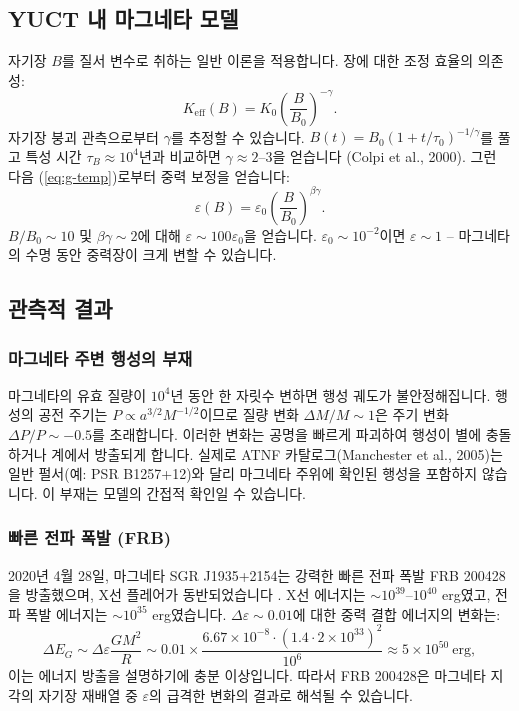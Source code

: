 \documentclass[11pt,a4paper]{article}
\newcommand{\Keff}{K_{\mathrm{eff}}}
\newcommand{\eps}{\varepsilon}
\begin{document}
	\subsection{YUCT 내 마그네타 모델}
	\label{subsec:magnetars-model}
	
	자기장 $B$를 질서 변수로 취하는 일반 이론을 적용합니다. 장에 대한 조정 효율의 의존성:
	\begin{equation}
		\Keff(B) = K_0 \left( \frac{B}{B_0} \right)^{-\gamma}.
		\label{eq:keff-b}
	\end{equation}
	자기장 붕괴 관측으로부터 $\gamma$를 추정할 수 있습니다. $B(t) = B_0 (1 + t/\tau_0)^{-1/\gamma}$를 풀고 특성 시간 $\tau_B \approx 10^4$년과 비교하면 $\gamma \approx 2$–$3$을 얻습니다 (Colpi et al., 2000). 그런 다음 (\ref{eq:g-temp})로부터 중력 보정을 얻습니다:
	\begin{equation}
		\eps(B) = \eps_0 \left( \frac{B}{B_0} \right)^{\beta\gamma}.
		\label{eq:eps-b}
	\end{equation}
	$B/B_0 \sim 10$ 및 $\beta\gamma \sim 2$에 대해 $\eps \sim 100 \eps_0$을 얻습니다. $\eps_0 \sim 10^{-2}$이면 $\eps \sim 1$ – 마그네타의 수명 동안 중력장이 크게 변할 수 있습니다.
	
	\subsection{관측적 결과}
	\label{subsec:magnetars-consequences}
	
	\subsubsection{마그네타 주변 행성의 부재}
	\label{subsubsec:magnetars-planets}
	
	마그네타의 유효 질량이 $10^4$년 동안 한 자릿수 변하면 행성 궤도가 불안정해집니다. 행성의 공전 주기는 $P \propto a^{3/2} M^{-1/2}$이므로 질량 변화 $\Delta M/M \sim 1$은 주기 변화 $\Delta P/P \sim -0.5$를 초래합니다. 이러한 변화는 공명을 빠르게 파괴하여 행성이 별에 충돌하거나 계에서 방출되게 합니다. 실제로 ATNF 카탈로그(Manchester et al., 2005)는 일반 펄서(예: PSR B1257+12)와 달리 마그네타 주위에 확인된 행성을 포함하지 않습니다. 이 부재는 모델의 간접적 확인일 수 있습니다.
	
	\subsubsection{빠른 전파 폭발 (FRB)}\label{subsec:magnetars-frb}
	
	2020년 4월 28일, 마그네타 SGR J1935+2154는 강력한 빠른 전파 폭발 FRB 200428을 방출했으며, X선 플레어가 동반되었습니다 \cite{Geng2020}. X선 에너지는 $\sim 10^{39}$–$10^{40}$ erg였고, 전파 폭발 에너지는 $\sim 10^{35}$ erg였습니다. $\Delta\eps \sim 0.01$에 대한 중력 결합 에너지의 변화는:
	\begin{equation}
		\Delta E_G \sim \Delta\eps \frac{GM^2}{R} \sim 0.01 \times \frac{6.67\times10^{-8} \cdot (1.4\cdot 2\times10^{33})^2}{10^6} \approx 5\times10^{50}\ \text{erg},
	\end{equation}
	이는 에너지 방출을 설명하기에 충분 이상입니다. 따라서 FRB 200428은 마그네타 지각의 자기장 재배열 중 $\eps$의 급격한 변화의 결과로 해석될 수 있습니다.
	
\end{document}
